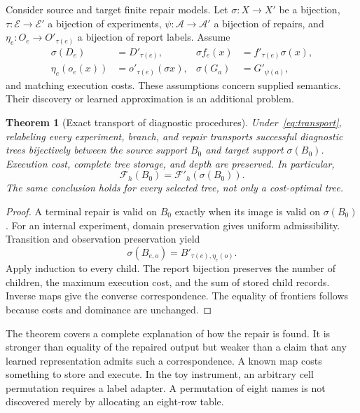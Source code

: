\documentclass[11pt,letterpaper]{article}
\theoremstyle{plain}
\newtheorem{theorem}{Theorem}[section]
\theoremstyle{definition}
\begin{document}
Consider source and target finite repair models. Let $\sigma:X\to X'$ be a bijection, $\tau:\mathcal E\to\mathcal E'$ a bijection of experiments, $\psi:\mathcal A\to\mathcal A'$ a bijection of repairs, and $\eta_e:O_e\to O'_{\tau(e)}$ a bijection of report labels. Assume
\begin{align}\label{eq:transport}
\sigma(D_e)&=D'_{\tau(e)}, &
\sigma f_e(x)&=f'_{\tau(e)}\sigma(x),\\
\eta_e(o_e(x))&=o'_{\tau(e)}(\sigma x), &
\sigma(G_a)&=G'_{\psi(a)},\nonumber
\end{align}
and matching execution costs. These assumptions concern supplied semantics. Their discovery or learned approximation is an additional problem.

\begin{theorem}[Exact transport of diagnostic procedures]\label{thm:transport}
Under~\eqref{eq:transport}, relabeling every experiment, branch, and repair transports successful diagnostic trees bijectively between the source support $B_0$ and target support $\sigma(B_0)$. Execution cost, complete tree storage, and depth are preserved. In particular,
\[
\mathcal F_h(B_0)=\mathcal F'_h(\sigma(B_0)).
\]
The same conclusion holds for every selected tree, not only a cost-optimal tree.
\end{theorem}
\begin{proof}
A terminal repair is valid on $B_0$ exactly when its image is valid on $\sigma(B_0)$. For an internal experiment, domain preservation gives uniform admissibility. Transition and observation preservation yield
\[
\sigma(B_{e,o})=B'_{\tau(e),\eta_e(o)}.
\]
Apply induction to every child. The report bijection preserves the number of children, the maximum execution cost, and the sum of stored child records. Inverse maps give the converse correspondence. The equality of frontiers follows because costs and dominance are unchanged.
\end{proof}

The theorem covers a complete explanation of how the repair is found. It is stronger than equality of the repaired output but weaker than a claim that any learned representation admits such a correspondence. A known map costs something to store and execute. In the toy instrument, an arbitrary cell permutation requires a label adapter. A permutation of eight names is not discovered merely by allocating an eight-row table.
\end{document}
